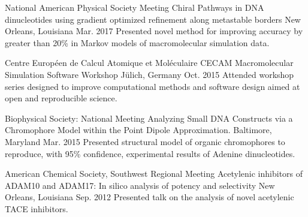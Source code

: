 \begin{cventries}
    \cventry
        {National American Physical Society Meeting}
        {Chiral Pathways in DNA dinucleotides using gradient optimized refinement along metastable borders}
        {New Orleans, Louisiana}
        {Mar. 2017}
        {Presented novel method for improving accuracy by greater than 20\% in Markov models of macromolecular simulation data. }

    \cventry
        {Centre Europ{\'e}en de Calcul Atomique et Mol{\'e}culaire}
        {CECAM Macromolecular Simulation Software Workshop}
        {J{\"u}lich, Germany}
        {Oct. 2015}
        {Attended workshop series designed to improve computational methods and software design aimed at open and reproducible science.}

    \cventry
        {Biophysical Society: National Meeting}
        {Analyzing Small DNA Constructs via a Chromophore Model within the Point Dipole Approximation.}
        {Baltimore, Maryland}
        {Mar. 2015}
        {Presented structural model of organic chromophores to reproduce, with 95\% confidence, experimental results of Adenine dinucleotides.}

    \cventry
        {American Chemical Society, Southwest Regional Meeting}
        {Acetylenic inhibitors of ADAM10 and ADAM17: In silico analysis of potency and selectivity}
        {New Orleans, Louisiana}
        {Sep. 2012}
        {Presented talk on the analysis of novel acetylenic TACE inhibitors.}
\end{cventries}
